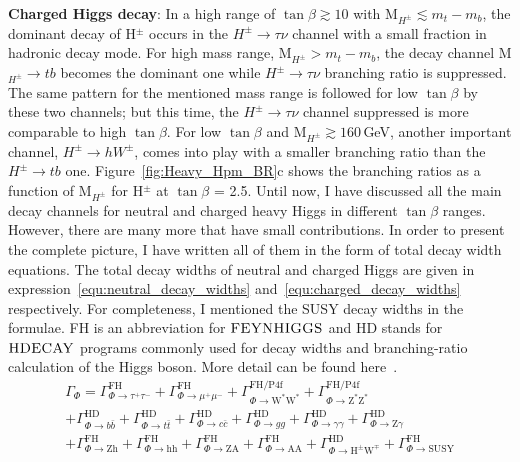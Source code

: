 \noindent \textbf{Charged Higgs decay}:
In a high range of $\tan\beta \gtrsim 10$ with M$_{H^{\pm}} \lesssim m_{t} - m_{b}$, the dominant decay of H$^{\pm}$ occurs in the $H^{\pm}\rightarrow \tau\nu$ channel with a small fraction in hadronic decay mode. For high mass range, M$_{H^{\pm}} > m_{t} - m_{b}$, the decay channel M$_{H^{\pm}} \rightarrow tb$ becomes the dominant one while $H^{\pm}\rightarrow \tau\nu$ branching ratio is suppressed. The same pattern for the mentioned mass range is followed for low $\tan\beta$ by these two channels; but this time, the $H^{\pm}\rightarrow \tau\nu$ channel suppressed is more comparable to high $\tan\beta$. For low $\tan\beta$ and M$_{H^{\pm}} \gtrsim 160 $\,GeV, another important channel, $H^{\pm}\rightarrow hW^{\pm}$, comes into play with a smaller branching ratio than the $H^{\pm}\rightarrow tb$ one. Figure~\ref{fig:Heavy_Hpm_BR}c shows the branching ratios as a function of M$_{H^{\pm}}$ for H$^{\pm}$ at $\tan\beta$ = 2.5. Until now, I have discussed all the main decay channels for neutral and charged heavy Higgs in different $\tan\beta$ ranges. However, there are many more that have small contributions. In order to present the complete picture, I have written all of them in the form of total decay width equations. The total decay widths of neutral and charged Higgs are given in expression~\ref{equ:neutral_decay_widths} and~\ref{equ:charged_decay_widths} respectively. For completeness, I mentioned the SUSY decay widths in the formulae. FH is an abbreviation for $\textsc{FEYNHIGGS}$ and HD stands for $\textsc{HDECAY}$ programs commonly used for decay widths and branching-ratio calculation of the Higgs boson. More detail can be found here~\cite{Dittmaier:2012vm}.
\begin{equation}\label{equ:neutral_decay_widths}
\begin{split}
\Gamma_{\Phi} = \Gamma^{\text{FH}}_{\Phi \rightarrow\tau^{+}\tau^{-}} + \Gamma^{\text{FH}}_{\Phi \rightarrow\mu^{+}\mu^{-}} + \Gamma^{\text{FH/P4f}}_{\Phi \rightarrow \text{W}^{*}\text{W}^{*}} + \Gamma^{\text{FH/P4f}}_{\Phi \rightarrow \text{Z}^{*}\text{Z}^{*}}\\
+ \Gamma^{\text{HD}}_{\Phi \rightarrow b\bar{b}} + \Gamma^{\text{HD}}_{\Phi \rightarrow t\bar{t}} + \Gamma^{\text{HD}}_{\Phi \rightarrow c\bar{c}} + \Gamma^{\text{HD}}_{\Phi \rightarrow gg} + \Gamma^{\text{HD}}_{\Phi \rightarrow \gamma \gamma} + \Gamma^{\text{HD}}_{\Phi \rightarrow \text{Z} \gamma}\\
+ \Gamma^{\text{FH}}_{\Phi \rightarrow \text{Zh}} + \Gamma^{\text{FH}}_{\Phi \rightarrow \text{hh}} + \Gamma^{\text{FH}}_{\Phi \rightarrow \text{ZA}} + \Gamma^{\text{FH}}_{\Phi \rightarrow \text{AA}}  + \Gamma^{\text{HD}}_{\Phi \rightarrow \text{H}^{\pm}\text{W}^{\mp}} + \Gamma^{\text{FH}}_{\Phi \rightarrow \text{SUSY}}
\end{split}
\end{equation}
